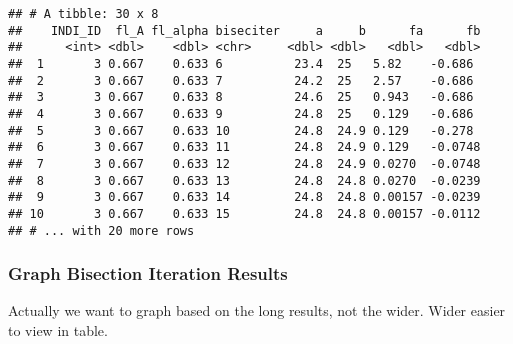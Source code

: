 \documentclass[]{article}
\newenvironment{Shaded}{\begin{snugshade}}{\end{snugshade}}
\newcommand{\DecValTok}[1]{\textcolor[rgb]{0.00,0.00,0.81}{#1}}
\newcommand{\KeywordTok}[1]{\textcolor[rgb]{0.13,0.29,0.53}{\textbf{#1}}}
\newcommand{\NormalTok}[1]{#1}
\newcommand{\OperatorTok}[1]{\textcolor[rgb]{0.81,0.36,0.00}{\textbf{#1}}}
\newcommand{\StringTok}[1]{\textcolor[rgb]{0.31,0.60,0.02}{#1}}
\begin{document}
\begin{Shaded}
\end{Shaded}

\begin{verbatim}
## # A tibble: 30 x 8
##    INDI_ID  fl_A fl_alpha biseciter     a     b      fa      fb
##      <int> <dbl>    <dbl> <chr>     <dbl> <dbl>   <dbl>   <dbl>
##  1       3 0.667    0.633 6          23.4  25   5.82    -0.686 
##  2       3 0.667    0.633 7          24.2  25   2.57    -0.686 
##  3       3 0.667    0.633 8          24.6  25   0.943   -0.686 
##  4       3 0.667    0.633 9          24.8  25   0.129   -0.686 
##  5       3 0.667    0.633 10         24.8  24.9 0.129   -0.278 
##  6       3 0.667    0.633 11         24.8  24.9 0.129   -0.0748
##  7       3 0.667    0.633 12         24.8  24.9 0.0270  -0.0748
##  8       3 0.667    0.633 13         24.8  24.8 0.0270  -0.0239
##  9       3 0.667    0.633 14         24.8  24.8 0.00157 -0.0239
## 10       3 0.667    0.633 15         24.8  24.8 0.00157 -0.0112
## # ... with 20 more rows
\end{verbatim}

\hypertarget{graph-bisection-iteration-results}{%
\subsubsection{Graph Bisection Iteration
Results}\label{graph-bisection-iteration-results}}

Actually we want to graph based on the long results, not the wider.
Wider easier to view in table.
\end{document}
